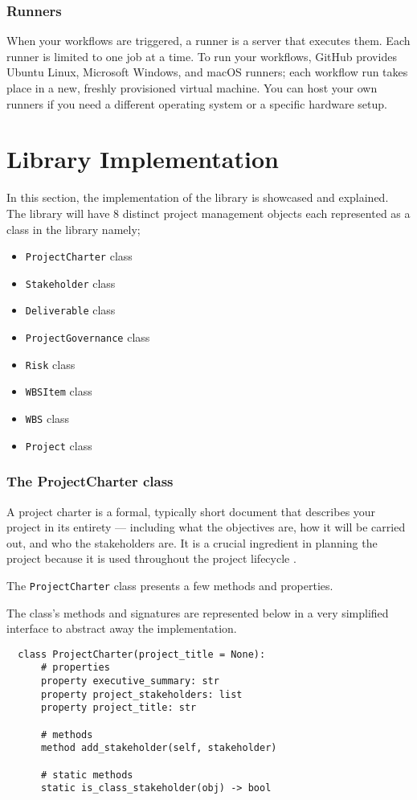 \subsubsection{Runners}
When your workflows are triggered, a runner is a server that executes them. Each runner is limited to one job at a time. To run your workflows, GitHub provides Ubuntu Linux, Microsoft Windows, and macOS runners; each workflow run takes place in a new, freshly provisioned virtual machine. You can host your own runners if you need a different operating system or a specific hardware setup.

\section{Library Implementation}
In this section, the implementation of the library is showcased and explained. The library will have 8 distinct project management objects each represented as a class in the library namely;

\begin{itemize}
  \item \verb +ProjectCharter+ class
  \item \verb +Stakeholder+ class
  \item \verb +Deliverable+ class
  \item \verb +ProjectGovernance+ class
  \item \verb +Risk+ class
  \item \verb +WBSItem+ class
  \item \verb +WBS+ class
  \item \verb +Project+ class
\end{itemize}

\subsubsection{The ProjectCharter class}
A project charter is a formal, typically short document that describes your project in its entirety — including what the objectives are, how it will be carried out, and who the stakeholders are. It is a crucial ingredient in planning the project because it is used throughout the project lifecycle \cite{wrike}.

The \verb+ProjectCharter+ class presents a few methods and properties.

The class's methods and signatures are represented below in a very simplified interface to abstract away the implementation.\\
\begin{lstlisting}
  class ProjectCharter(project_title = None):
      # properties
      property executive_summary: str
      property project_stakeholders: list
      property project_title: str

      # methods
      method add_stakeholder(self, stakeholder)

      # static methods
      static is_class_stakeholder(obj) -> bool
\end{lstlisting}


